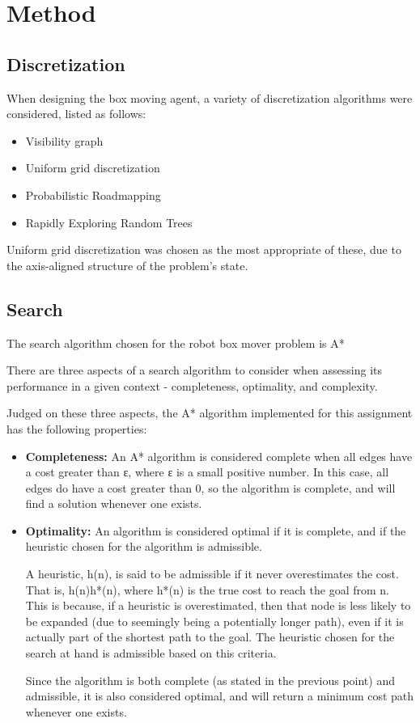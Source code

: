 \section{Method}

\subsection{Discretization}
When designing the box moving agent, a variety of discretization algorithms were considered, listed as follows:

\begin{itemize}
\item Visibility graph
\item Uniform grid discretization
\item Probabilistic Roadmapping
\item Rapidly Exploring Random Trees
\end{itemize}

Uniform grid discretization was chosen as the most appropriate of these, due to the axis-aligned structure of the problem’s state.


\subsection{Search}
The search algorithm chosen for the robot box mover problem is A*

There are three aspects of a search algorithm to consider when assessing its performance in a given context - completeness, optimality, and complexity.

Judged on these three aspects, the A* algorithm implemented for this assignment has the following properties:

\begin{itemize}
\item \textbf{Completeness:} An A* algorithm is considered complete when all edges have a cost greater than ε, where ε is a small positive number. In this case, all edges do have a cost greater than 0, so the algorithm is complete, and will find a solution whenever one exists.
\item \textbf{Optimality:} An algorithm is considered optimal if it is complete, and if the heuristic chosen for the algorithm is admissible.

A heuristic, h(n), is said to be admissible if it never overestimates the cost. That is, h(n)h*(n), where h*(n) is the true cost to reach the goal from n. This is because, if a heuristic is overestimated, then that node is less likely to be expanded (due to seemingly being a potentially longer path), even if it is actually part of the shortest path to the goal. The heuristic chosen for the search at hand is admissible based on this criteria.

Since the algorithm is both complete (as stated in the previous point) and admissible, it is also considered optimal, and will return a minimum cost path whenever one exists.
\end{itemize}

